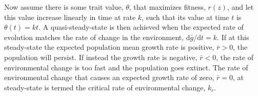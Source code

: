 \documentclass[12pt,letterpaper]{article} %
\begin{document}
Now assume there is some trait value, $\theta$, that maximizes fitness, $r(z)$, and let this value increase linearly in time at rate $k$, such that its value at time $t$  is $\theta(t) = k t$. %
A quasi-steady-state is then achieved when the expected rate of evolution matches the rate of change in the environment, $\mathrm{d}\bar{g}/\mathrm{d}t = k$.
If at this steady-state the expected population mean growth rate is positive, $\bar{r} > 0$, the population will persist.
If instead the growth rate is negative, $\bar{r} < 0$, the rate of environmental change is too fast and the population goes extinct.
The rate of environmental change that causes an expected growth rate of zero, $\bar{r} =0$, at steady-state is termed the critical rate of environmental change, $k_c$. 
\end{document}
